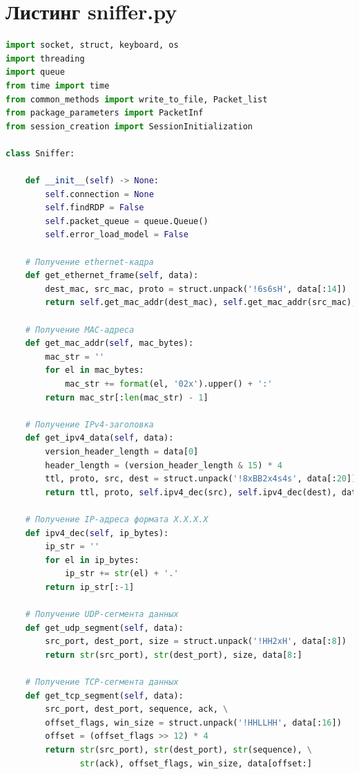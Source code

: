 \documentclass[bachelor, och, coursework]{SCWorks}
\begin{document}
  \appendix

    \section{Листинг sniffer.py}

    \begin{lstlisting}[language=Python]
import socket, struct, keyboard, os
import threading
import queue
from time import time
from common_methods import write_to_file, Packet_list
from package_parameters import PacketInf
from session_creation import SessionInitialization

class Sniffer:

    def __init__(self) -> None:
        self.connection = None
        self.findRDP = False
        self.packet_queue = queue.Queue()
        self.error_load_model = False

    # Получение ethernet-кадра
    def get_ethernet_frame(self, data):
        dest_mac, src_mac, proto = struct.unpack('!6s6sH', data[:14])
        return self.get_mac_addr(dest_mac), self.get_mac_addr(src_mac), socket.htons(proto)

    # Получение MAC-адреса
    def get_mac_addr(self, mac_bytes):
        mac_str = ''
        for el in mac_bytes:
            mac_str += format(el, '02x').upper() + ':'
        return mac_str[:len(mac_str) - 1]

    # Получение IPv4-заголовка
    def get_ipv4_data(self, data):
        version_header_length = data[0]
        header_length = (version_header_length & 15) * 4
        ttl, proto, src, dest = struct.unpack('!8xBB2x4s4s', data[:20])
        return ttl, proto, self.ipv4_dec(src), self.ipv4_dec(dest), data[header_length:]

    # Получение IP-адреса формата X.X.X.X
    def ipv4_dec(self, ip_bytes):
        ip_str = ''
        for el in ip_bytes:
            ip_str += str(el) + '.'
        return ip_str[:-1]

    # Получение UDP-сегмента данных
    def get_udp_segment(self, data):
        src_port, dest_port, size = struct.unpack('!HH2xH', data[:8])
        return str(src_port), str(dest_port), size, data[8:]

    # Получение TCP-cегмента данных
    def get_tcp_segment(self, data):
        src_port, dest_port, sequence, ack, \
        offset_flags, win_size = struct.unpack('!HHLLHH', data[:16])
        offset = (offset_flags >> 12) * 4
        return str(src_port), str(dest_port), str(sequence), \
               str(ack), offset_flags, win_size, data[offset:]


\end{lstlisting}
\end{document}
